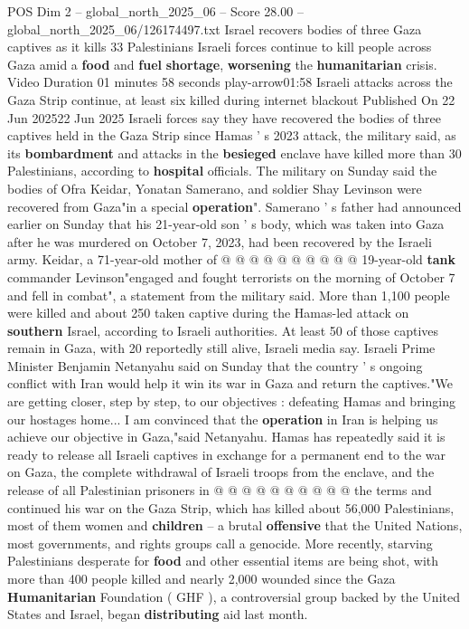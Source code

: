 \begin{textsample}{POS Dim 2 – global\_north\_2025\_06 – Score 28.00 – global\_north\_2025\_06/126174497.txt}  \label{ex:f2_pos_228}
Israel recovers bodies of three Gaza captives as it kills 33 Palestinians Israeli forces continue to kill people across Gaza amid a \textbf{food} and \textbf{fuel} \textbf{shortage}, \textbf{worsening} the \textbf{humanitarian} crisis.
Video Duration 01 minutes 58 seconds play-arrow01:58 Israeli attacks across the Gaza Strip continue, at least six killed during internet blackout Published On 22 Jun 202522 Jun 2025 Israeli forces say they have recovered the bodies of three captives held in the Gaza Strip since Hamas ' s 2023 attack, the military said, as its \textbf{bombardment} and attacks in the \textbf{besieged} enclave have killed more than 30 Palestinians, according to \textbf{hospital} officials.
The military on Sunday said the bodies of Ofra Keidar, Yonatan Samerano, and soldier Shay Levinson were recovered from Gaza"in a special \textbf{operation}".
Samerano ' s father had announced earlier on Sunday that his 21-year-old son ' s body, which was taken into Gaza after he was murdered on October 7, 2023, had been recovered by the Israeli army.
Keidar, a 71-year-old mother of @ @ @ @ @ @ @ @ @ @ 19-year-old \textbf{tank} commander Levinson"engaged and fought terrorists on the morning of October 7 and fell in combat", a statement from the military said.
More than 1,100 people were killed and about 250 taken captive during the Hamas-led attack on \textbf{southern} Israel, according to Israeli authorities.
At least 50 of those captives remain in Gaza, with 20 reportedly still alive, Israeli media say.
Israeli Prime Minister Benjamin Netanyahu said on Sunday that the country ' s ongoing conflict with Iran would help it win its war in Gaza and return the captives."We are getting closer, step by step, to our objectives : defeating Hamas and bringing our hostages home...
I am convinced that the \textbf{operation} in Iran is helping us achieve our objective in Gaza,"said Netanyahu.
Hamas has repeatedly said it is ready to release all Israeli captives in exchange for a permanent end to the war on Gaza, the complete withdrawal of Israeli troops from the enclave, and the release of all Palestinian prisoners in @ @ @ @ @ @ @ @ @ @ the terms and continued his war on the Gaza Strip, which has killed about 56,000 Palestinians, most of them women and \textbf{children} -- a brutal \textbf{offensive} that the United Nations, most governments, and rights groups call a genocide.
More recently, starving Palestinians desperate for \textbf{food} and other essential items are being shot, with more than 400 people killed and nearly 2,000 wounded since the Gaza \textbf{Humanitarian} Foundation ( GHF ), a controversial group backed by the United States and Israel, began \textbf{distributing} aid last month.

\end{textsample}

